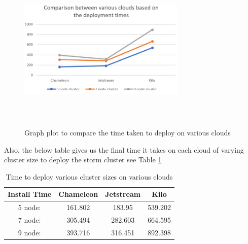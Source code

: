 \documentclass[9pt,twocolumn,twoside]{../../styles/osajnl}
\begin{document}
\begin{figure}[!htb]
  \includegraphics[width=8cm,height=8cm,keepaspectratio,width=\linewidth]{images/bar-4.png}
  \caption{Graph plot to compare the time taken to deploy on various clouds}
  \label{gvc}
\end{figure}

Also, the below table gives us the final time it takes on each cloud of varying cluster size to deploy the storm cluster see Table \ref{T:gvc}

\begin{table}[h]
\begin{center}
  \centering
  \caption{ Time to deploy various cluster sizes on various clouds}
  \label{T:gvc}
 \begin{tabular}{|c|| c c c|} 
 \hline
 Install Time & Chameleon  & Jetstream & Kilo \\ [0.5ex]
 \hline\hline
 5 node: & 161.802 & 183.95 & 539.202\\
 \hline
 7 node: & 305.494 & 282.603 & 664.595 \\
 \hline
 9 node: & 393.716 & 316.451 & 892.398 \\
 \hline
\end{tabular}
\end{center}
\end{table}
\end{document}
